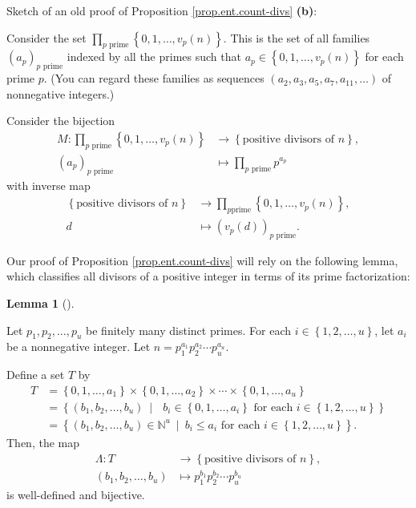 \documentclass[numbers=enddot,12pt,final,onecolumn,notitlepage]{scrartcl}%
\numberwithin{exer}{subsection}
\theoremstyle{definition}
\newtheorem{lem}[theo]{Lemma}
\newenvironment{lemma}[1][]
{\begin{lem}[#1]\begin{leftbar}}
{\end{leftbar}\end{lem}}
\let\prodnonlimits\prod
\renewcommand{\prod}{\prodnonlimits\limits}
\newenvironment{noncompile}{}{}
\begin{document}
\begin{noncompile}
Sketch of an old proof of Proposition \ref{prop.ent.count-divs} \textbf{(b)}:

Consider the set $\prod_{p\text{ prime}}\left\{  0,1,\ldots,v_{p}\left(
n\right)  \right\}  $. This is the set of all families $\left(  a_{p}\right)
_{p\text{ prime}}$ indexed by all the primes such that $a_{p}\in\left\{
0,1,\ldots,v_{p}\left(  n\right)  \right\}  $ for each prime $p$. (You can
regard these families as sequences $\left(  a_{2},a_{3},a_{5},a_{7}%
,a_{11},\ldots\right)  $ of nonnegative integers.)

Consider the bijection%
\begin{align*}
M:\prod_{p\text{ prime}}\left\{  0,1,\ldots,v_{p}\left(  n\right)  \right\}
&  \rightarrow\left\{  \text{positive divisors of }n\right\}  ,\\
\left(  a_{p}\right)  _{p\text{ prime}}  &  \mapsto\prod_{p\text{ prime}%
}p^{a_{p}}%
\end{align*}
with inverse map%
\begin{align*}
\left\{  \text{positive divisors of }n\right\}   &  \rightarrow\prod_{p\text{
prime}}\left\{  0,1,\ldots,v_{p}\left(  n\right)  \right\}  ,\\
d  &  \mapsto\left(  v_{p}\left(  d\right)  \right)  _{p\text{ prime}}.
\end{align*}

\end{noncompile}

Our proof of Proposition \ref{prop.ent.count-divs} will rely on the following
lemma, which classifies all divisors of a positive integer in terms of its
prime factorization:

\begin{lemma}
\label{lem.ent.divs-bijs}Let $p_{1},p_{2},\ldots,p_{u}$ be finitely many
distinct primes. For each $i\in\left\{  1,2,\ldots,u\right\}  $, let $a_{i}$
be a nonnegative integer. Let $n=p_{1}^{a_{1}}p_{2}^{a_{2}}\cdots p_{u}%
^{a_{u}}$.

Define a set $T$ by%
\begin{align*}
T  &  =\left\{  0,1,\ldots,a_{1}\right\}  \times\left\{  0,1,\ldots
,a_{2}\right\}  \times\cdots\times\left\{  0,1,\ldots,a_{u}\right\} \\
&  =\left\{  \left(  b_{1},b_{2},\ldots,b_{u}\right)  \ \mid\text{ }b_{i}%
\in\left\{  0,1,\ldots,a_{i}\right\}  \text{ for each }i\in\left\{
1,2,\ldots,u\right\}  \right\} \\
&  =\left\{  \left(  b_{1},b_{2},\ldots,b_{u}\right)  \in\mathbb{N}^{u}%
\ \mid\ b_{i}\leq a_{i}\text{ for each }i\in\left\{  1,2,\ldots,u\right\}
\right\}  .
\end{align*}
Then, the map%
\begin{align*}
\Lambda:T  &  \rightarrow\left\{  \text{positive divisors of }n\right\}  ,\\
\left(  b_{1},b_{2},\ldots,b_{u}\right)   &  \mapsto p_{1}^{b_{1}}p_{2}%
^{b_{2}}\cdots p_{u}^{b_{u}}%
\end{align*}
is well-defined and bijective.
\end{lemma}
\end{document}
